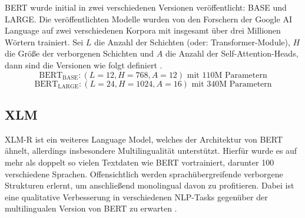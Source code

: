 \noindent
\ac{BERT} wurde initial in zwei verschiedenen Versionen veröffentlicht: BASE und LARGE. Die veröffentlichten Modelle wurden von den Forschern der Google AI Language auf zwei verschiedenen Korpora mit insgesamt über drei Millionen Wörtern trainiert. Sei $L$ die Anzahl der Schichten (oder: Transformer-Module), $H$ die Größe der verborgenen Schichten und $A$ die Anzahl der Self-Attention-Heads, dann sind die Versionen wie folgt definiert \cite[S.~3-5]{DEV19}. $$\text{BERT}_{\text{BASE}}: (L=12, H=768, A=12) \text{ mit } 110 \text{M Parametern}$$ $$\text{BERT}_{\text{LARGE}}: (L=24, H=1024, A=16) \text{ mit } 340 \text{M Parametern}$$

\subsection{XLM}
\noindent
\ac{XLM-R} ist ein weiteres Language Model, welches der Architektur von \ac{BERT} ähnelt, allerdings insbesondere Multilingualität unterstützt. Hierfür wurde es auf mehr als doppelt so vielen Textdaten wie \ac{BERT} vortrainiert, darunter 100 verschiedene Sprachen. Offensichtlich werden sprachübergreifende verborgene Strukturen erlernt, um anschließend monolingual davon zu profitieren. Dabei ist eine qualitative Verbesserung in verschiedenen \ac{NLP}-Tasks gegenüber der multilingualen Version von \ac{BERT} zu erwarten \cite{CON20}.
